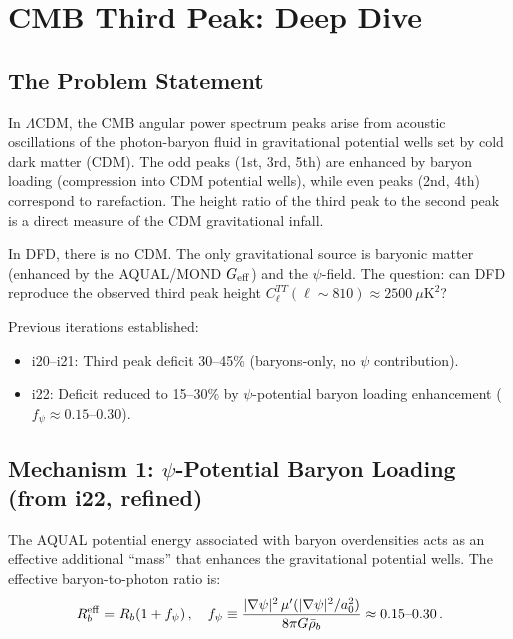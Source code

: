 \documentclass[11pt]{article}
\newcommand{\LCDM}{$\Lambda$CDM}
\newcommand{\Geff}{G_{\rm eff}}
\newcommand{\aM}{a_0}
\newcommand{\rhob}{\bar{\rho}_b}
\begin{document}
\section{CMB Third Peak: Deep Dive}
\label{sec:cmb}

\subsection{The Problem Statement}

In \LCDM, the CMB angular power spectrum peaks arise from acoustic
oscillations of the photon-baryon fluid in gravitational potential wells
set by cold dark matter (CDM).  The odd peaks (1st, 3rd, 5th) are
enhanced by baryon loading (compression into CDM potential wells), while
even peaks (2nd, 4th) correspond to rarefaction.  The height ratio of
the third peak to the second peak is a direct measure of the CDM
gravitational infall.

In DFD, there is no CDM.  The only gravitational source is baryonic
matter (enhanced by the AQUAL/MOND $\Geff$) and the $\psi$-field.
The question: can DFD reproduce the observed third peak height
$C_\ell^{TT}(\ell \sim 810) \approx 2500~\mu\text{K}^2$?

Previous iterations established:
\begin{itemize}
\item i20--i21: Third peak deficit 30--45\% (baryons-only, no $\psi$
  contribution).
\item i22: Deficit reduced to 15--30\% by $\psi$-potential baryon
  loading enhancement ($f_\psi \approx 0.15$--$0.30$).
\end{itemize}

\subsection{Mechanism 1: $\psi$-Potential Baryon Loading (from i22, refined)}

The AQUAL potential energy associated with baryon overdensities acts as
an effective additional ``mass'' that enhances the gravitational
potential wells.  The effective baryon-to-photon ratio is:
\begin{equation}
R_b^{\rm eff} = R_b(1 + f_\psi)\,,
\quad
f_\psi \equiv \frac{|\nabla\psi|^2\,\mu'(|\nabla\psi|^2/\aM^2)}
{8\pi G\rhob} \approx 0.15\text{--}0.30\,.
\end{equation}
\end{document}
